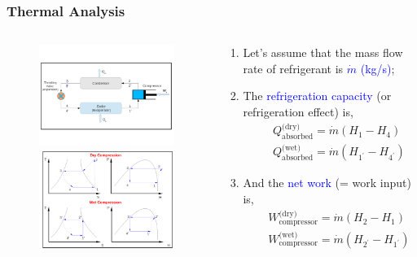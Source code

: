 \documentclass[10pt,compress]{beamer}
\begin{document}
\begin{frame}
 \frametitle{Thermal Analysis}
 \begin{columns}
  \begin{column}[c]{0.35\linewidth}
   \begin{figure}%
     \vbox{
      \includegraphics[width=4.5cm,clip]{./Pics/Overview_Refrig12}
      \vspace{-.5cm}
    \includegraphics[width=4.5cm,clip]{./Pics/Overview_Refrig13}}
   \end{figure}  
  \end{column}  
  \begin{column}[c]{0.65\linewidth}
   \begin{enumerate}
    \item <1-> Let's assume that the mass flow rate of refrigerant is \textcolor{blue}{$\dot{m}$ (kg/s)};
    \item <2-> The \textcolor{blue}{refrigeration capacity} (or refrigeration effect) is,
       \begin{eqnarray}
        &&Q_{\text{absorbed}}^{\text{(dry)}} = \dot{m}\left(H_{1}-H_{4}\right) \nonumber \\
        &&Q_{\text{absorbed}}^{\text{(wet)}} = \dot{m}\left(H_{1^{\prime}}-H_{4^{\prime}}\right) \nonumber        
       \end{eqnarray}
     \item <3-> And the \textcolor{blue}{net work} (= work input) is,
       \begin{eqnarray}     
        &&W_{\text{compressor}}^{\text{(dry)}} = \dot{m}\left(H_{2}-H_{1}\right) \nonumber \\
        &&W_{\text{compressor}}^{\text{(wet)}} = \dot{m}\left(H_{2^{\prime}}-H_{1^{\prime}}\right) \nonumber
       \end{eqnarray}
   \end{enumerate}
  \end{column}  
 \end{columns}
\end{frame}
\end{document}
